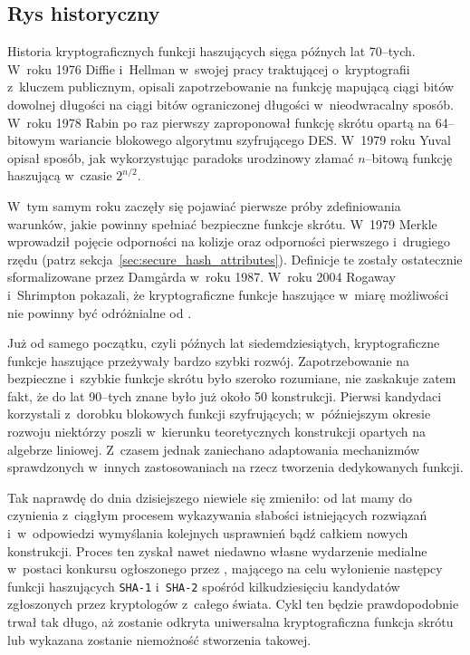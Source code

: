 \subsection{Rys historyczny}
Historia kryptograficznych funkcji haszujących sięga późnych lat 70--tych.
W~roku 1976 Diffie i~Hellman w~swojej pracy traktującej o~kryptografii
z~kluczem publicznym, opisali zapotrzebowanie na funkcję mapującą ciągi bitów
dowolnej długości na ciągi bitów ograniczonej długości w~nieodwracalny sposób.
W~roku 1978 Rabin po raz pierwszy zaproponował funkcję skrótu opartą na
64--bitowym wariancie blokowego algorytmu szyfrującego DES. W~1979 roku Yuval
opisał sposób, jak wykorzystując paradoks urodzinowy złamać $n$--bitową funkcję
haszującą w~czasie $2^{n/2}$.

W~tym samym roku zaczęły się pojawiać pierwsze próby zdefiniowania warunków,
jakie powinny spełniać bezpieczne funkcje skrótu. W~1979 Merkle wprowadził
pojęcie odporności na kolizje oraz odporności pierwszego i~drugiego rzędu
(patrz sekcja~\ref{sec:secure_hash_attributes}). Definicje te zostały
ostatecznie sformalizowane przez Damg\r{a}rda w~roku 1987. W~roku 2004 Rogaway
i~Shrimpton pokazali, że kryptograficzne funkcje haszujące w~miarę możliwości
nie powinny być odróżnialne od .

Już od samego początku, czyli późnych lat siedemdziesiątych, kryptograficzne
funkcje haszujące przeżywały bardzo szybki rozwój. Zapotrzebowanie na
bezpieczne i~szybkie funkcje skrótu było szeroko rozumiane, nie zaskakuje zatem
fakt, że do lat 90--tych znane było już około 50 konstrukcji. Pierwsi kandydaci
korzystali z~dorobku blokowych funkcji szyfrujących; w~późniejszym okresie
rozwoju niektórzy poszli w~kierunku teoretycznych konstrukcji opartych na
algebrze liniowej. Z~czasem jednak zaniechano adaptowania mechanizmów
sprawdzonych w~innych zastosowaniach na rzecz tworzenia dedykowanych funkcji.

Tak naprawdę do dnia dzisiejszego niewiele się zmieniło: od lat mamy do
czynienia z~ciągłym procesem wykazywania słabości istniejących rozwiązań
i~w~odpowiedzi wymyślania kolejnych usprawnień bądź całkiem nowych konstrukcji.
Proces ten zyskał nawet niedawno własne wydarzenie medialne w~postaci konkursu
ogłoszonego przez , mającego
na celu wyłonienie następcy funkcji haszujących \texttt{SHA-1} i~\texttt{SHA-2}
spośród kilkudziesięciu kandydatów zgłoszonych przez kryptologów z~całego
świata. Cykl ten będzie prawdopodobnie trwał tak długo, aż zostanie odkryta
uniwersalna kryptograficzna funkcja skrótu lub wykazana zostanie niemożność
stworzenia takowej.
